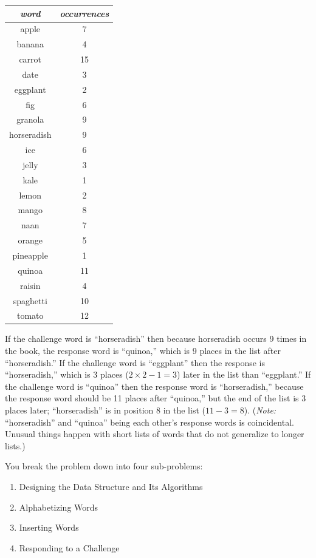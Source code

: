 \begin{center}
    \begin{tabular}{cc}
        \textit{word} & \textit{occurrences} \\ \hline
        apple       & 7 \\
        banana      & 4 \\
        carrot      & 15 \\
        date        & 3 \\
        eggplant    & 2 \\
        fig         & 6 \\
        granola     & 9 \\
        horseradish & 9 \\
        ice         & 6 \\
        jelly       & 3 \\
        kale        & 1 \\
        lemon       & 2 \\
        mango       & 8 \\
        naan        & 7 \\
        orange      & 5 \\
        pineapple   & 1 \\
        quinoa      & 11 \\
        raisin      & 4 \\
        spaghetti   & 10 \\
        tomato      & 12 \\
    \end{tabular}
\end{center}
If the challenge word is ``horseradish'' then because horseradish occurs 9 times in the book, the response word is ``quinoa,'' which is 9 places in the list after ``horseradish.''
If the challenge word is ``eggplant'' then the response is ``horseradish,'' which is 3 places ($2 \times 2 - 1 = 3$) later in the list than ``eggplant.''
If the challenge word is ``quinoa'' then the response word is ``horseradish,'' because the response word should be 11 places after ``quinoa,'' but the end of the list is 3 places later;
``horseradish'' is in position 8 in the list ($11 - 3 = 8$).
(\textit{Note:} ``horseradish'' and ``quinoa'' being each other's response words is coincidental.
Unusual things happen with short lists of words that do not generalize to longer lists.)

You break the problem down into four sub-problems:

\begin{enumerate}
    \item Designing the Data Structure and Its Algorithms
    \item Alphabetizing Words
    \item Inserting Words
    \item Responding to a Challenge
\end{enumerate}

